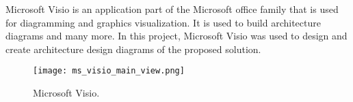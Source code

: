 Microsoft Visio is an application part of the Microsoft office family that is used for diagramming and graphics visualization. It is used to build architecture diagrams and many more. In this project, Microsoft Visio was used to design and create architecture design diagrams of the proposed solution.

\begin{figure}[H]
    \centering \texttt{[image: ms\_visio\_main\_view.png]}
    \caption{Microsoft Visio.}
    \label{fig:ms-visio}
\end{figure}







